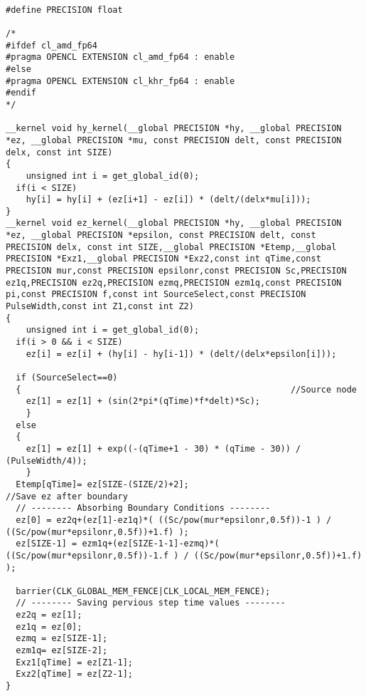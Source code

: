 \begin{lstlisting}

#define PRECISION float

/*
#ifdef cl_amd_fp64
#pragma OPENCL EXTENSION cl_amd_fp64 : enable
#else
#pragma OPENCL EXTENSION cl_khr_fp64 : enable
#endif
*/

__kernel void hy_kernel(__global PRECISION *hy, __global PRECISION *ez, __global PRECISION *mu, const PRECISION delt, const PRECISION delx, const int SIZE) 
{
	unsigned int i = get_global_id(0);
  if(i < SIZE)
    hy[i] = hy[i] + (ez[i+1] - ez[i]) * (delt/(delx*mu[i]));
}
__kernel void ez_kernel(__global PRECISION *hy, __global PRECISION *ez, __global PRECISION *epsilon, const PRECISION delt, const PRECISION delx, const int SIZE,__global PRECISION *Etemp,__global PRECISION *Exz1,__global PRECISION *Exz2,const int qTime,const PRECISION mur,const PRECISION epsilonr,const PRECISION Sc,PRECISION ez1q,PRECISION ez2q,PRECISION ezmq,PRECISION ezm1q,const PRECISION pi,const PRECISION f,const int SourceSelect,const PRECISION PulseWidth,const int Z1,const int Z2)
{
	unsigned int i = get_global_id(0);
  if(i > 0 && i < SIZE)
    ez[i] = ez[i] + (hy[i] - hy[i-1]) * (delt/(delx*epsilon[i]));

  if (SourceSelect==0)	
  {														//Source node
	ez[1] = ez[1] + (sin(2*pi*(qTime)*f*delt)*Sc);
	}
  else
  {
	ez[1] = ez[1] + exp((-(qTime+1 - 30) * (qTime - 30)) / (PulseWidth/4));
	}
  Etemp[qTime]= ez[SIZE-(SIZE/2)+2]; 													//Save ez after boundary
  // -------- Absorbing Boundary Conditions -------- 
  ez[0] = ez2q+(ez[1]-ez1q)*( ((Sc/pow(mur*epsilonr,0.5f))-1 ) / ((Sc/pow(mur*epsilonr,0.5f))+1.f) );
  ez[SIZE-1] = ezm1q+(ez[SIZE-1-1]-ezmq)*( ((Sc/pow(mur*epsilonr,0.5f))-1.f ) / ((Sc/pow(mur*epsilonr,0.5f))+1.f) );	  
  
  barrier(CLK_GLOBAL_MEM_FENCE|CLK_LOCAL_MEM_FENCE);    
  // -------- Saving pervious step time values -------- 
  ez2q = ez[1]; 
  ez1q = ez[0]; 
  ezmq = ez[SIZE-1];
  ezm1q= ez[SIZE-2];
  Exz1[qTime] = ez[Z1-1];
  Exz2[qTime] = ez[Z2-1];
}

\end{lstlisting}